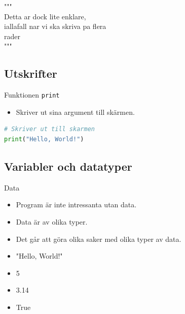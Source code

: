 \begin{frame}[fragile]
  \begin{example}
"""\\
Detta ar dock lite enklare,\\
iallafall nar vi ska skriva pa flera\\
rader\\
"""
  \end{example}
\end{frame}


\subsection{Utskrifter}

\begin{frame}[fragile]
  \begin{block}{Funktionen \lstinline{print}}
    \begin{itemize}
      \item Skriver ut sina argument till skärmen.
    \end{itemize}
  \end{block}

  \pause

  \begin{example}
    \begin{lstlisting}[language=python]
# Skriver ut till skarmen
print("Hello, World!")
    \end{lstlisting}
  \end{example}
\end{frame}


\subsection{Variabler och datatyper}

\begin{frame}
  \begin{block}{Data}
    \begin{itemize}
      \item Program är inte intressanta utan data.
      \item Data är av olika typer.
      \item Det går att göra olika saker med olika typer av data.
    \end{itemize}
  \end{block}

  \pause

  \begin{example}[Litteraler]
    \begin{itemize}
      \item "Hello, World!"
      \item 5
      \item 3.14
      \item True
    \end{itemize}
  \end{example}
\end{frame}

